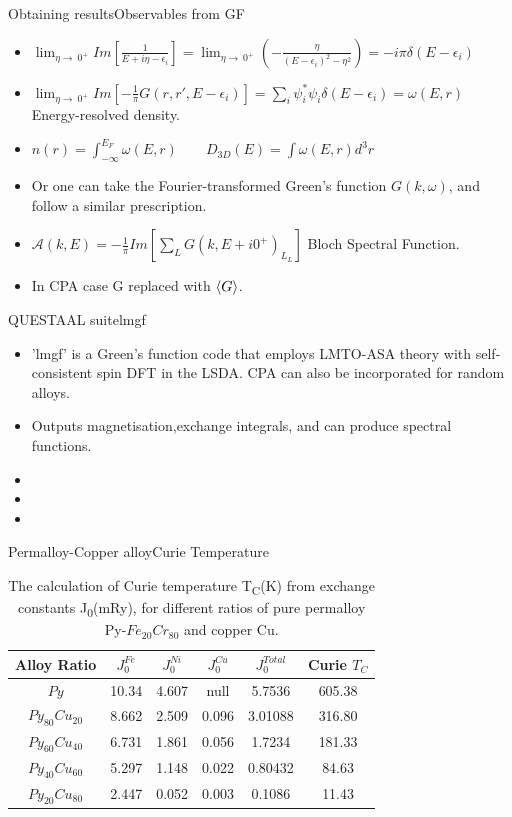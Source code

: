 \documentclass{beamer}
\begin{document}
\begin{frame}{Obtaining results}{Observables from GF}
  \begin{itemize}
      \item { $\lim_{\eta\to\ 0^+}Im[\frac{1}{E+i\eta-\epsilon_i}]=\lim_{\eta\to\ 0^+}(-\frac{\eta}{(E-\epsilon_i)^2-\eta^2})=-i\pi \delta(E-\epsilon_i)$}
      \item {$\lim_{\eta\to\ 0^+}Im[-\frac{1}{\pi}G(r,r',E-\epsilon_i)]=\sum_i \psi^*_i\psi_i \delta(E-\epsilon_i)=\omega(E,r)$ Energy-resolved density.}
      \item {$n(r)=\int_{-\infty}^{E_F}\omega(E,r) \qquad D_{3D}(E)=\int \omega(E,r) d^3r$}
      \item {Or one can take the Fourier-transformed Green's function $G(k,\omega)$, and follow a similar prescription.}
      \item {$\mathcal{A}(k,E)=-\frac{1}{\pi} Im[\sum_L G(k,E+i0^+)_L_L]$ Bloch Spectral Function.}
      \item{In CPA case G replaced with $\expval{G}$.}
  \end{itemize}
\end{frame}

\begin{frame}{QUESTAAL suite}{lmgf}
  \begin{itemize}
      \item {'lmgf' is a Green's function code that employs LMTO-ASA theory with self-consistent spin DFT in the LSDA. CPA can also be incorporated for random alloys.}
      \item {Outputs magnetisation,exchange integrals, and can produce spectral functions.}
      \item {}
      \item {}
      \item {}
  \end{itemize}
\end{frame}

\begin{frame}{Permalloy-Copper alloy}{Curie Temperature}
      \begin{table}[h!]
\centering
 \begin{tabular}{||c c c c c c||} 
 \hline
 Alloy Ratio & $J_0^{Fe}$ & $J_0^{Ni}$ & $J_0^{Cu}$ & $J_0^{Total}$ & Curie $T_C$ \\ [1ex] 
 \hline\hline
 $Py$ & 10.34 & 4.607 & null & 5.7536 & 605.38 \\ 
 $Py_{80}Cu_{20}$ & 8.662 & 2.509 & 0.096 & 3.01088 & 316.80 \\
 $Py_{60}Cu_{40}$ & 6.731 & 1.861 & 0.056 & 1.7234 & 181.33 \\
 $Py_{40}Cu_{60}$ & 5.297 & 1.148 & 0.022 & 0.80432 & 84.63 \\
 $Py_{20}Cu_{80}$ & 2.447 & 0.052 & 0.003 & 0.1086 & 11.43 \\ [1ex] 
 \hline
 \end{tabular}
\caption{The calculation of Curie temperature T\textsubscript{C}(K) from exchange constants J\textsubscript{0}(mRy), for different ratios of pure permalloy Py-$Fe_{20}Cr_{80}$ and copper Cu.} 
\end{table}
\end{frame}
\end{document}
